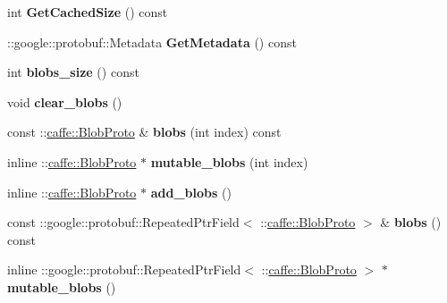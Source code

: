 \begin{DoxyCompactItemize}
int {\bfseries Get\+Cached\+Size} () const
\item 
\mbox{\label{classcaffe_1_1_blob_proto_vector_a9e4f51f8a4f030caf55529f964136a6f}} 
\+::google\+::protobuf\+::\+Metadata {\bfseries Get\+Metadata} () const
\item 
\mbox{\label{classcaffe_1_1_blob_proto_vector_a050d9feb39c79e46253c0190a6ad2b49}} 
int {\bfseries blobs\+\_\+size} () const
\item 
\mbox{\label{classcaffe_1_1_blob_proto_vector_a05a473e12d698929781b00577bec2652}} 
void {\bfseries clear\+\_\+blobs} ()
\item 
\mbox{\label{classcaffe_1_1_blob_proto_vector_a694d1824b54ba70a058610f8354caeaa}} 
const \+::\mbox{\hyperlink{classcaffe_1_1_blob_proto}{caffe\+::\+Blob\+Proto}} \& {\bfseries blobs} (int index) const
\item 
\mbox{\label{classcaffe_1_1_blob_proto_vector_ac46df327aa9d669852fc80aac9debb33}} 
inline \+::\mbox{\hyperlink{classcaffe_1_1_blob_proto}{caffe\+::\+Blob\+Proto}} $\ast$ {\bfseries mutable\+\_\+blobs} (int index)
\item 
\mbox{\label{classcaffe_1_1_blob_proto_vector_a56f8a1c8f63703aeb679db02b4b8ebea}} 
inline \+::\mbox{\hyperlink{classcaffe_1_1_blob_proto}{caffe\+::\+Blob\+Proto}} $\ast$ {\bfseries add\+\_\+blobs} ()
\item 
\mbox{\label{classcaffe_1_1_blob_proto_vector_a4fb7d9bb97d6e72c388284d8f7cfe1eb}} 
const \+::google\+::protobuf\+::\+Repeated\+Ptr\+Field$<$ \+::\mbox{\hyperlink{classcaffe_1_1_blob_proto}{caffe\+::\+Blob\+Proto}} $>$ \& {\bfseries blobs} () const
\item 
\mbox{\label{classcaffe_1_1_blob_proto_vector_ab29e1aaa6f2a129fc8d4cab0d2f706ed}} 
inline \+::google\+::protobuf\+::\+Repeated\+Ptr\+Field$<$ \+::\mbox{\hyperlink{classcaffe_1_1_blob_proto}{caffe\+::\+Blob\+Proto}} $>$ $\ast$ {\bfseries mutable\+\_\+blobs} ()
\item 

\end{DoxyCompactItemize}
